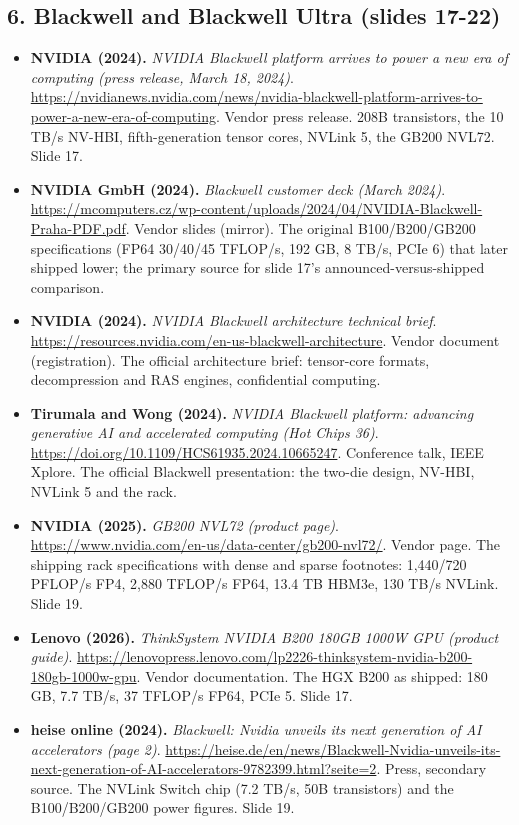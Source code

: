 \documentclass[11pt,letterpaper]{article}
\begin{document}
\subsection*{6. Blackwell and Blackwell Ultra (slides 17-22)}
\begin{itemize}[leftmargin=1.2em,itemsep=3pt]\sloppy
\item \textbf{NVIDIA (2024).} \textit{NVIDIA Blackwell platform arrives to power a new era of computing (press release, March 18, 2024)}. \url{https://nvidianews.nvidia.com/news/nvidia-blackwell-platform-arrives-to-power-a-new-era-of-computing}. Vendor press release. 208B transistors, the 10 TB/s NV-HBI, fifth-generation tensor cores, NVLink 5, the GB200 NVL72. Slide 17.
\item \textbf{NVIDIA GmbH (2024).} \textit{Blackwell customer deck (March 2024)}. \url{https://mcomputers.cz/wp-content/uploads/2024/04/NVIDIA-Blackwell-Praha-PDF.pdf}. Vendor slides (mirror). The original B100/B200/GB200 specifications (FP64 30/40/45 TFLOP/s, 192 GB, 8 TB/s, PCIe 6) that later shipped lower; the primary source for slide 17's announced-versus-shipped comparison.
\item \textbf{NVIDIA (2024).} \textit{NVIDIA Blackwell architecture technical brief}. \url{https://resources.nvidia.com/en-us-blackwell-architecture}. Vendor document (registration). The official architecture brief: tensor-core formats, decompression and RAS engines, confidential computing.
\item \textbf{Tirumala and Wong (2024).} \textit{NVIDIA Blackwell platform: advancing generative AI and accelerated computing (Hot Chips 36)}. \url{https://doi.org/10.1109/HCS61935.2024.10665247}. Conference talk, IEEE Xplore. The official Blackwell presentation: the two-die design, NV-HBI, NVLink 5 and the rack.
\item \textbf{NVIDIA (2025).} \textit{GB200 NVL72 (product page)}. \url{https://www.nvidia.com/en-us/data-center/gb200-nvl72/}. Vendor page. The shipping rack specifications with dense and sparse footnotes: 1,440/720 PFLOP/s FP4, 2,880 TFLOP/s FP64, 13.4 TB HBM3e, 130 TB/s NVLink. Slide 19.
\item \textbf{Lenovo (2026).} \textit{ThinkSystem NVIDIA B200 180GB 1000W GPU (product guide)}. \url{https://lenovopress.lenovo.com/lp2226-thinksystem-nvidia-b200-180gb-1000w-gpu}. Vendor documentation. The HGX B200 as shipped: 180 GB, 7.7 TB/s, 37 TFLOP/s FP64, PCIe 5. Slide 17.
\item \textbf{heise online (2024).} \textit{Blackwell: Nvidia unveils its next generation of AI accelerators (page 2)}. \url{https://heise.de/en/news/Blackwell-Nvidia-unveils-its-next-generation-of-AI-accelerators-9782399.html?seite=2}. Press, secondary source. The NVLink Switch chip (7.2 TB/s, 50B transistors) and the B100/B200/GB200 power figures. Slide 19.

\end{itemize}
\end{document}
